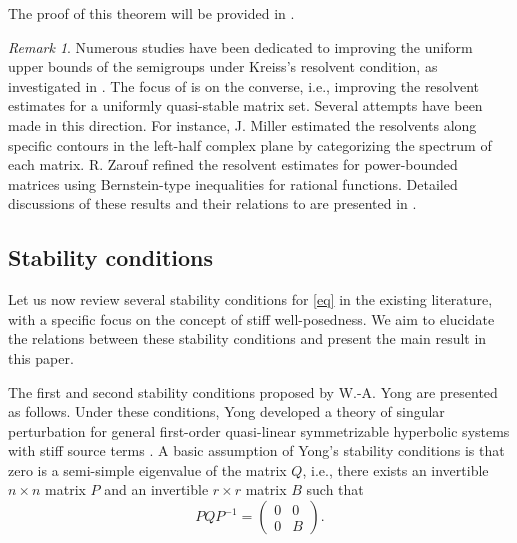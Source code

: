 \documentclass{article}
\theoremstyle{plain}%
\theoremstyle{definition}%
\theoremstyle{remark}%
\newtheorem{remark}{Remark}%
\newcommand{\+}[1]{{\bm{#1}}}
\begin{document}
The proof of this theorem will be provided in .

\begin{remark}
  Numerous studies have been dedicated to improving the uniform upper 
  bounds of the semigroups under Kreiss's resolvent condition, 
  as investigated in \cite{leveque_resolvent_1984,van_linear_1993}. 
  The focus of  is on the converse, i.e., improving 
  the resolvent estimates for a uniformly quasi-stable matrix set.
  Several attempts have been made in this direction. For instance,  
  J. Miller \cite{miller_resolvent_1968} estimated the resolvents 
  along specific contours in the left-half complex plane by 
  categorizing the spectrum of each matrix. 
  R. Zarouf \cite{zarouf_sharpening_2009} refined 
  the resolvent estimates for power-bounded matrices using 
  Bernstein-type inequalities for rational functions.
  Detailed discussions of these results and their relations to 
   are presented in .
\end{remark}



\subsection{Stability conditions}

Let us now review several stability conditions for \cref{eq} in 
the existing literature, with a specific focus on the concept of 
stiff well-posedness. 
We aim to elucidate the relations between these stability conditions 
and present the main result in this paper.

The first and second stability conditions proposed by W.-A. Yong 
\cite{Yong2001basic} are presented as follows.
Under these conditions, Yong developed a theory of singular 
perturbation for general first-order quasi-linear symmetrizable 
hyperbolic systems with stiff source terms 
\cite{Yong_singular_1992,Yong_singular_1999,
Yong2001basic,Yong_basic_2002}. 
A basic assumption of Yong's stability conditions is that zero is a 
semi-simple eigenvalue of the matrix $Q$, i.e., there exists an 
invertible $n \times n$ matrix $P$ and an invertible $r \times r$ 
matrix $B$ such that 
\begin{equation}\label{eq:Yong1_PQPinv}
  P Q P^{-1} = \begin{pmatrix}
    0 & 0 \\ 0 & B
  \end{pmatrix}.
\end{equation}
\end{document}

